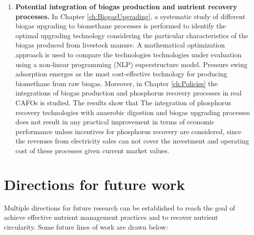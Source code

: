 \begin{enumerate}[font=\bfseries]
	\item \textbf{Potential integration of biogas production and nutrient recovery processes.} In Chapter \ref{ch:BiogasUpgrading}, a systematic study of different biogas upgrading to biomethane processes is performed to identify the optimal upgrading technology considering the particular characteristics of the biogas produced from livestock manure.  A mathematical optimization approach is used to compare the technologies technologies under evaluation using a non-linear programming (NLP) superstructure model. Pressure swing adsorption emerges as the most cost-effective technology for producing biomethane from raw biogas. Moreover, in Chapter \ref{ch:Policies} the integrations of biogas production and phosphorus recovery processes in real CAFOs is studied. The results show that The integration of phosphorus recovery technologies with anaerobic 	digestion and biogas upgrading processes does not result in any practical 	improvement in terms of economic performance unless incentives for 	phosphorus recovery are considered, since the revenues from electricity sales can not cover the investment and operating cost of these processes	given current market values.
\end{enumerate}


\section{Directions for future work}
Multiple directions for future research can be established to reach the goal of achieve effective nutrient management practices and to recover nutrient circularity. Some future lines of work are drawn below:

